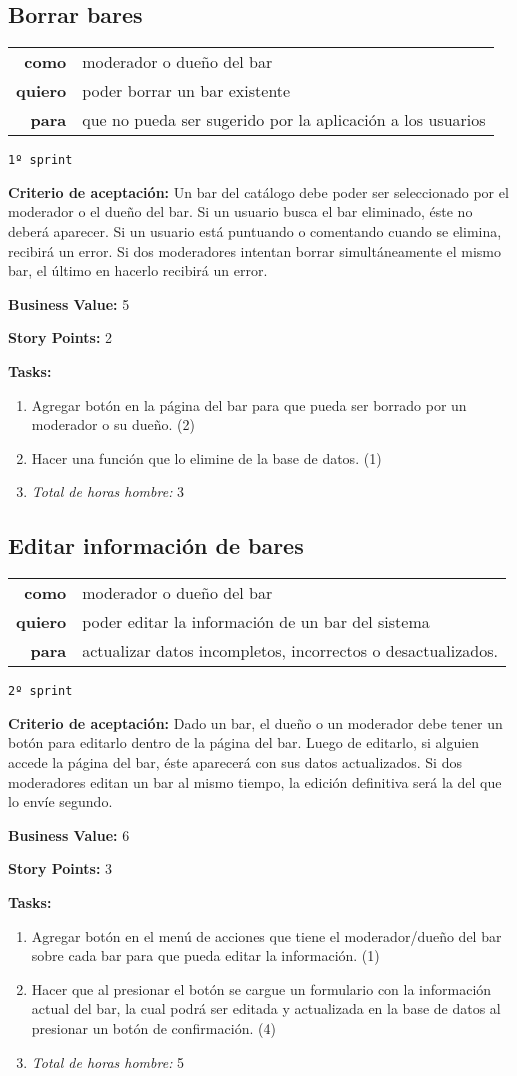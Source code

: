 \documentclass[hidelinks,a4paper,11pt, nofootinbib]{article}
\newcommand{\userstory}[3]{
\begin{tabular}{|r p{10cm}|}
  \hline
  \textbf{como} & #1 \\
  \textbf{quiero} & #2 \\
  \textbf{para} & #3 \\
  \hline
\end{tabular}

}
\newcommand{\critdeacep}[1]{\textbf{Criterio de aceptación:} #1

}
\newcommand{\busvalue}[1]{\textbf{Business Value:} #1

}
\newcommand{\storypoints}[1]{\textbf{Story Points:} #1

}
\newcommand{\primersprint}{\texttt{1º sprint}

}
\newcommand{\segundosprint}{\texttt{2º sprint}

}
\newcommand{\tasks}[1]{\textbf{Tasks:} 

#1}
\begin{document}
\subsection*{Borrar bares}
\userstory{moderador o dueño del bar}{poder borrar un bar existente}{que no pueda ser sugerido por la aplicación a los usuarios}
\primersprint
\critdeacep{Un bar del catálogo debe poder ser seleccionado por el moderador o el dueño del bar. Si un usuario busca el bar eliminado, éste no deberá aparecer. Si un usuario está puntuando o comentando cuando se elimina, recibirá un error. Si dos moderadores intentan borrar simultáneamente el mismo bar, el último en hacerlo recibirá un error.}
\busvalue{5}
\storypoints{2}
\tasks{
  \begin{enumerate}
    \item Agregar botón en la página del bar para que pueda ser borrado por un moderador o su dueño. (2)
    \item Hacer una función que lo elimine de la base de datos. (1)
    \item[] \textit{Total de horas hombre:} 3
  \end{enumerate}
}

\subsection*{Editar información de bares}
\userstory{moderador o dueño del bar}{poder editar la información de un bar del sistema}{actualizar datos incompletos, incorrectos o desactualizados.
}
\segundosprint
\critdeacep{Dado un bar, el dueño o un moderador debe tener un botón para editarlo dentro de la página del bar. Luego de editarlo, si alguien accede la página del bar, éste aparecerá con sus datos actualizados. Si dos moderadores editan un bar al mismo tiempo, la edición definitiva será la del que lo envíe segundo.}
\busvalue{6}
\storypoints{3}
\tasks{
  \begin{enumerate}
    \item Agregar botón en el menú de acciones que tiene el moderador/dueño del bar sobre cada bar para que pueda editar la información. (1)
    \item Hacer que al presionar el botón se cargue un formulario con la información actual del bar, la cual podrá ser editada y actualizada en la base de datos al presionar un botón de confirmación. (4)
    \item[] \textit{Total de horas hombre:} 5
  \end{enumerate}
}
    
\end{document}
